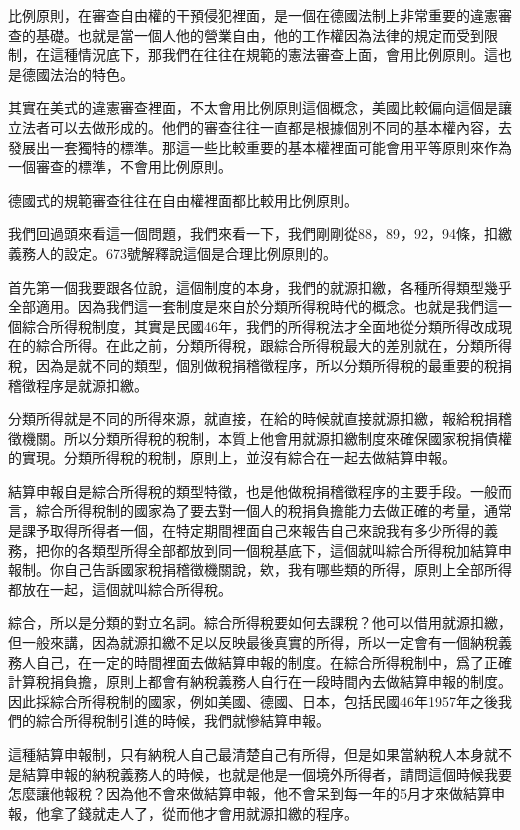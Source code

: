 \documentclass[oneside,sub3section]{ctexbook}
\begin{document}
比例原則，在審查自由權的干預侵犯裡面，是一個在德國法制上非常重要的違憲審查的基礎。也就是當一個人他的營業自由，他的工作權因為法律的規定而受到限制，在這種情況底下，那我們在往往在規範的憲法審查上面，會用比例原則。這也是德國法治的特色。

其實在美式的違憲審查裡面，不太會用比例原則這個概念，美國比較偏向這個是讓立法者可以去做形成的。他們的審查往往一直都是根據個別不同的基本權內容，去發展出一套獨特的標準。那這一些比較重要的基本權裡面可能會用平等原則來作為一個審查的標準，不會用比例原則。

德國式的規範審查往往在自由權裡面都比較用比例原則。

我們回過頭來看這一個問題，我們來看一下，我們剛剛從88，89，92，94條，扣繳義務人的設定。673號解釋說這個是合理比例原則的。

首先第一個我要跟各位說，這個制度的本身，我們的就源扣繳，各種所得類型幾乎全部適用。因為我們這一套制度是來自於分類所得稅時代的概念。也就是我們這一個綜合所得稅制度，其實是民國46年，我們的所得稅法才全面地從分類所得改成現在的綜合所得。在此之前，分類所得稅，跟綜合所得稅最大的差別就在，分類所得稅，因為是就不同的類型，個別做稅捐稽徵程序，所以分類所得稅的最重要的稅捐稽徵程序是就源扣繳。

分類所得就是不同的所得來源，就直接，在給的時候就直接就源扣繳，報給稅捐稽徵機關。所以分類所得稅的稅制，本質上他會用就源扣繳制度來確保國家稅捐債權的實現。分類所得稅的稅制，原則上，並沒有綜合在一起去做結算申報。

結算申報自是綜合所得稅的類型特徵，也是他做稅捐稽徵程序的主要手段。一般而言，綜合所得稅制的國家為了要去對一個人的稅捐負擔能力去做正確的考量，通常是課予取得所得者一個，在特定期間裡面自己來報告自己來說我有多少所得的義務，把你的各類型所得全部都放到同一個稅基底下，這個就叫綜合所得稅加結算申報制。你自己告訴國家稅捐稽徵機關說，欸，我有哪些類的所得，原則上全部所得都放在一起，這個就叫綜合所得稅。

綜合，所以是分類的對立名詞。綜合所得稅要如何去課稅？他可以借用就源扣繳，但一般來講，因為就源扣繳不足以反映最後真實的所得，所以一定會有一個納稅義務人自己，在一定的時間裡面去做結算申報的制度。在綜合所得稅制中，爲了正確計算稅捐負擔，原則上都會有納稅義務人自行在一段時間內去做結算申報的制度。因此採綜合所得稅制的國家，例如美國、德國、日本，包括民國46年1957年之後我們的綜合所得稅制引進的時候，我們就慘結算申報。

這種結算申報制，只有納稅人自己最清楚自己有所得，但是如果當納稅人本身就不是結算申報的納稅義務人的時候，也就是他是一個境外所得者，請問這個時候我要怎麼讓他報稅？因為他不會來做結算申報，他不會呆到每一年的5月才來做結算申報，他拿了錢就走人了，從而他才會用就源扣繳的程序。
\end{document}
